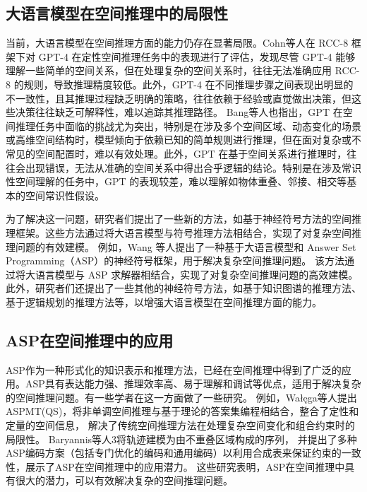 \subsection{大语言模型在空间推理中的局限性}
当前，大语言模型在空间推理方面的能力仍存在显著局限。Cohn\cite{cohn2023evaluation}等人在 RCC-8 框架下对 GPT-4 在定性空间推理任务中的表现进行了评估，发现尽管 GPT-4 能够理解一些简单的空间关系，但在处理复杂的空间关系时，往往无法准确应用 RCC-8 的规则，导致推理精度较低。此外，GPT-4 在不同推理步骤之间表现出明显的不一致性，且其推理过程缺乏明确的策略，往往依赖于经验或直觉做出决策，但这些决策往往缺乏可解释性，难以追踪其推理路径。
Bang\cite{bang2023multitask}等人也指出，GPT 在空间推理任务中面临的挑战尤为突出，特别是在涉及多个空间区域、动态变化的场景或高维空间结构时，模型倾向于依赖已知的简单规则进行推理，但在面对复杂或不常见的空间配置时，难以有效处理。此外，GPT 在基于空间关系进行推理时，往往会出现错误，无法从准确的空间关系中得出合乎逻辑的结论。特别是在涉及常识性空间理解的任务中，GPT 的表现较差，难以理解如物体重叠、邻接、相交等基本的空间常识性假设。

为了解决这一问题，研究者们提出了一些新的方法，如基于神经符号方法的空间推理框架。这些方法通过将大语言模型与符号推理方法相结合，实现了对复杂空间推理问题的有效建模。
例如，Wang \cite{ishay2023leveraging}等人提出了一种基于大语言模型和 Answer Set Programming（ASP）的神经符号框架，用于解决复杂空间推理问题。
该方法通过将大语言模型与 ASP 求解器相结合，实现了对复杂空间推理问题的高效建模。此外，研究者们还提出了一些其他的神经符号方法，如基于知识图谱的推理方法、基于逻辑规划的推理方法等，以增强大语言模型在空间推理方面的能力。
\subsection{ASP在空间推理中的应用}
ASP作为一种形式化的知识表示和推理方法，已经在空间推理中得到了广泛的应用。ASP具有表达能力强、推理效率高、易于理解和调试等优点，适用于解决复杂的空间推理问题。有一些学者在这一方面做了一些研究。
例如，Wałęga\cite{walega2015aspmtqs}等人提出ASPMT(QS)，将非单调空间推理与基于理论的答案集编程相结合，整合了定性和定量的空间信息，
解决了传统空间推理方法在处理复杂空间变化和组合约束时的局限性。
Baryannis\cite{Baryannis2018Trajectory}等人3将轨迹建模为由不重叠区域构成的序列，
并提出了多种ASP编码方案（包括专门优化的编码和通用编码）以利用合成表来保证约束的一致性，展示了ASP在空间推理中的应用潜力。
这些研究表明，ASP在空间推理中具有很大的潜力，可以有效解决复杂的空间推理问题。

